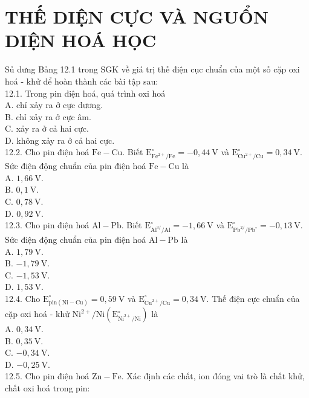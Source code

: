 \documentclass[10pt]{article}
\begin{document}
\section*{THẾ DIỆN CỰC VÀ NGUỔN DIỆN HOÁ HỌC}
Sủ dưng Bảng 12.1 trong SGK về giá trị thế điện cục chuẩn của một số cặp oxi hoá - khử để hoàn thành các bài tập sau:\\
12.1. Trong pin điện hoá, quá trình oxi hoá\\
A. chỉ xảy ra ở cực dương.\\
B. chỉ xảy ra ở cực âm.\\
C. xảy ra ở cả hai cực.\\
D. không xảy ra ở cả hai cực.\\
12.2. Cho pin điện hoá $\mathrm{Fe}-\mathrm{Cu}$. Biết $\mathrm{E}_{\mathrm{Fe}^{2+} / \mathrm{Fe}}^{\circ}=-0,44 \mathrm{~V}$ và $\mathrm{E}_{\mathrm{Cu}^{2+} / \mathrm{Cu}}^{\circ}=0,34 \mathrm{~V}$. Sức điện động chuẩn của pin điện hoá $\mathrm{Fe}-\mathrm{Cu}$ là\\
A. $1,66 \mathrm{~V}$.\\
B. $0,1 \mathrm{~V}$.\\
C. $0,78 \mathrm{~V}$.\\
D. $0,92 \mathrm{~V}$.\\
12.3. Cho pin điện hoá $\mathrm{Al}-\mathrm{Pb}$. Biết $\mathrm{E}_{\mathrm{Al}^{3 /} / \mathrm{Al}}^{\circ}=-1,66 \mathrm{~V}$ và $\mathrm{E}_{\mathrm{Pb}^{2 /} / \mathrm{Pb}^{\circ}}^{\circ}=-0,13 \mathrm{~V}$. Sức điện động chuẩn của pin điện hoá $\mathrm{Al}-\mathrm{Pb}$ là\\
A. $1,79 \mathrm{~V}$.\\
B. $-1,79 \mathrm{~V}$.\\
C. $-1,53 \mathrm{~V}$.\\
D. $1,53 \mathrm{~V}$.\\
12.4. Cho $\mathrm{E}_{\mathrm{pin}(\mathrm{Ni}-\mathrm{Cu})}^{\circ}=0,59 \mathrm{~V}$ và $\mathrm{E}_{\mathrm{Cu}^{2+} / \mathrm{Cu}}^{\circ}=0,34 \mathrm{~V}$. Thế điện cực chuẩn của cặp oxi hoá - khử $\mathrm{Ni}^{2+} / \mathrm{Ni}\left(\mathrm{E}_{\mathrm{Ni}^{2+} / \mathrm{Ni}}^{\circ}\right)$ là\\
A. $0,34 \mathrm{~V}$.\\
B. $0,35 \mathrm{~V}$.\\
C. $-0,34 \mathrm{~V}$.\\
D. $-0,25 \mathrm{~V}$.\\
12.5. Cho pin điện hoá $\mathrm{Zn}-\mathrm{Fe}$. Xác định các chất, ion đóng vai trò là chất khử, chất oxi hoá trong pin:\\
\end{document}
